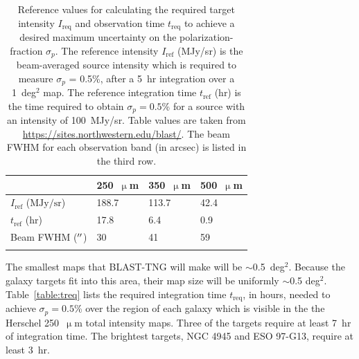 \begin{table}[!htbp]
\centering
\begin{tabular}{@{}llll@{}}
\dtoprule{}
 & 250~$\upmu$m & 350~$\upmu$m & 500~$\upmu$m \\ \midrule
$I_{\mathrm{ref}}$ ($\mathrm{MJy/sr}$) & 188.7 & 113.7 & 42.4 \\
$t_{\mathrm{ref}}$ ($\mathrm{hr}$) & 17.8 & 6.4 & 0.9 \\
Beam FWHM ($\operatorname{^{\prime\prime}}$) & 30 & 41 & 59 \\ \dbottomrule{}
\\
\end{tabular}
\caption[~Reference values for calculating the required target intensity  and observation time  to achieve a desired maximum uncertainty on the polarization-fraction .]{Reference values for calculating the required target intensity $I_{\mathrm{req}}$ and observation time $t_{\mathrm{req}}$ to achieve a desired maximum uncertainty on the polarization-fraction $\sigma_{p}$. The reference intensity $I_{\mathrm{ref}}$ (MJy/sr) is the beam-averaged source intensity which is required to measure $\sigma_{p}$ = 0.5\%, after a 5~hr integration over a 1~deg$^{2}$ map. The reference integration time $t_{\mathrm{ref}}$ (hr) is the time required to obtain $\sigma_{p} = 0.5$\% for a source with an intensity of 100~MJy/sr. Table values are taken from \url{https://sites.northwestern.edu/blast/}. The beam FWHM for each observation band (in arcsec) is listed in the third row.}
\label{table:map speed}
\end{table}

The smallest maps that BLAST-TNG will make will be $\sim$0.5~deg$^{2}$. Because the galaxy targets fit into this area, their map size will be uniformly $\sim$0.5 deg$^{2}$. Table~\ref{table:treq} lists the required integration time $t_{\mathrm{req}}$, in hours, needed to achieve $\sigma_{p} = 0.5$\% over the region of each galaxy which is visible in the the Herschel 250~$\upmu$m total intensity maps. Three of the targets require at least 7~hr of integration time. The brightest targets, NGC 4945 and ESO 97-G13, require at least 3~hr.

